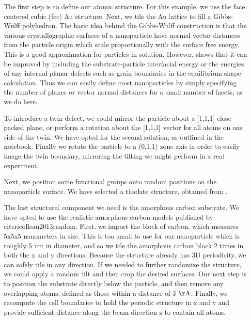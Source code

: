 \documentclass[%
 superscriptaddress,
 aip,
 amsmath,amssymb,
preprint,%
 author-year,%
longbibliography
]{revtex4-2}
\begin{document}
The first step is to define our atomic structure. For this example, we use the face centered cubic (fcc) Au structure. Next, we tile the Au lattice to fill a Gibbs-Wulff \citep{wulff1901question} polyhedron. The basic idea behind the Gibbs-Wulff construction is that the various crystallographic surfaces of a nanoparticle have normal vector distances from the particle origin which scale proportionally with the surface free energy. This is a good approximation for particles in solution. However, \cite{winterbottom1967equilibrium} shows that it can be improved by including the substrate-particle interfacial energy or the energies of any internal planar defects such as grain boundaries in the equilibrium shape calculation. Thus we can easily define most nanoparticles by simply specifying the number of planes or vector normal distances for a small number of facets, as we do here.

To introduce a twin defect, we could mirror the particle about a [1,1,1] close-packed plane, or perform a rotation about the [1,1,1] vector for all atoms on one side of the twin. We have opted for the second solution, as outlined in the notebook. Finally we rotate the particle to a (0,1,1) zone axis in order to easily image the twin boundary, mirroring the tilting we might perform in a real experiment.

Next, we position some functional groups onto random positions on the nanoparticle surface. We have selected a thiolate structure,  obtained from \cite{yang2007synthesis}. 

The last structural component we need is the amorphous carbon substrate. We have opted to use the realistic amorphous carbon models published by cite{ricolleau2013random}. First, we import the block of carbon, which measures 5x5x5 nanometers in size.  This is too small to use for our nanoparticle which is roughly 5 nm in diameter, and so we tile the amorphous carbon block 2 times in both the x and y directions. Because the structure already has 3D periodicity, we can safely tile in any direction. If we needed to further randomize the structure, we could apply a random tilt and then crop the desired surfaces. Our next step is to position the substrate directly below the particle, and then remove any overlapping atoms, defined as those within a distance of 3 $\rm{\AA}$. Finally, we recompute the cell boundaries to hold the periodic structure in x and y and provide sufficient distance along the beam direction z to contain all atoms.
\end{document}
